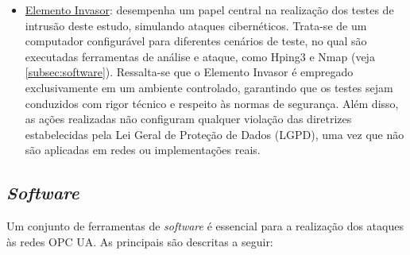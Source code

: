 \begin{itemize}
            \item \underline{Elemento Invasor}: desempenha um papel central na realização dos testes de intrusão deste estudo, simulando ataques cibernéticos. Trata-se de um computador configurável para diferentes cenários de teste, no qual são executadas ferramentas de análise e ataque, como Hping3 e Nmap (veja \autoref{subsec:software}). Ressalta-se que o Elemento Invasor é empregado exclusivamente em um ambiente controlado, garantindo que os testes sejam conduzidos com rigor técnico e respeito às normas de segurança. Além disso, as ações realizadas não configuram qualquer violação das diretrizes estabelecidas pela Lei Geral de Proteção de Dados (LGPD), uma vez que não são aplicadas em redes ou implementações reais.
        \end{itemize}
    
    \subsection{\textit{Software}} \label{subsec:software}

        Um conjunto de ferramentas de \textit{software} é essencial para a realização dos ataques às redes OPC UA. As principais são descritas a seguir:

